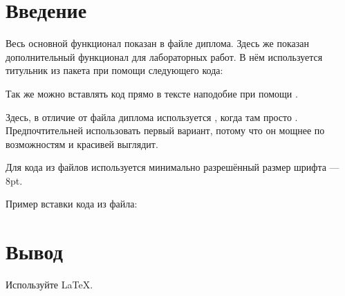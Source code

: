 \documentclass{universityreport}
\begin{document}

\chapter{Введение}\fixTexttTextscSpaceBug

Весь основной функционал показан в файле диплома. Здесь же показан дополнительный функционал для лабораторных работ. В нём используется титульник из пакета  при помощи следующего кода:


Так же можно вставлять код прямо в тексте наподобие  при помощи . 

Здесь, в отличие от файла диплома используется , когда там просто . Предпочтительней использовать первый вариант, потому что он мощнее по возможностям и красивей выглядит.

Для кода из файлов используется минимально разрешённый размер шрифта --- 8pt.

Пример вставки кода из файла:


\chapter{Вывод}

Используйте \LaTeX.
\end{document}
